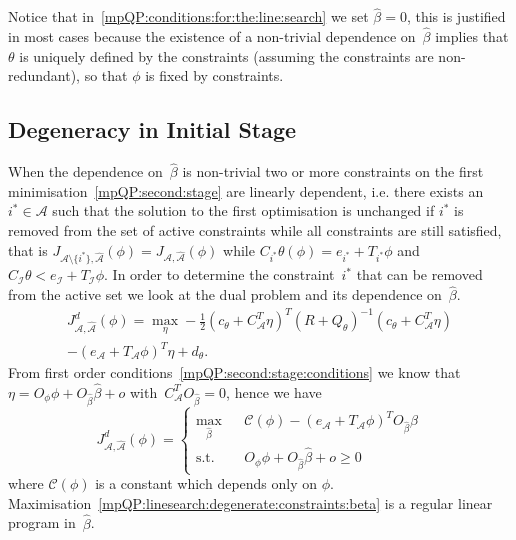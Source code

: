 \documentclass[journal]{IEEEtran}
\theoremstyle{remark}
\theoremstyle{definition}
\begin{document}
Notice that in~\eqref{mpQP:conditions:for:the:line:search} we set $\hat \beta=0$, this is justified in
most cases because the existence of a non-trivial dependence on~$\hat\beta$ implies that $\theta$ is uniquely
defined by the constraints (assuming the constraints are non-redundant), so that $\phi$ is fixed by constraints.
%
\subsection{Degeneracy in Initial Stage}\label{ssec:degeneracy}
%
When the dependence on~$\hat\beta$ is non-trivial two or more constraints on the first minimisation~\eqref{mpQP:second:stage}
are linearly dependent,
% 
i.e. there exists an $i^\ast\in\mathcal A$ such that the solution
to the first optimisation is unchanged if $i^\ast$ is removed from the set of active constraints while all
constraints are still satisfied, that is $J_{\mathcal A\setminus \{i^\ast\},\hat{\mathcal A}}(\phi)=J_{\mathcal A,\hat{\mathcal A}}(\phi)$
while $C_{i^\ast}\theta(\phi)=e_{i^\ast}+T_{i^\ast}\phi$ and $C_{\mathcal I}\theta<e_{\mathcal I}+T_{\mathcal I}\phi$.
%
In order to determine the constraint~$i^\ast$ that can be removed from the active set we look at the dual
problem and its dependence on~$\hat\beta$.
%
\begin{multline}
  J_{\mathcal A,\hat{\mathcal A}}^d(\phi) = \max_\eta -\frac{1}{2} (c_\theta+C^T_{\mathcal A}\eta)^T(R+Q_\theta)^{-1}
  (c_\theta+C^T_{\mathcal A}\eta)\\
  -(e_{\mathcal A}+T_{\mathcal A}\phi)^T \eta+ d_\theta.
\end{multline}
%
From first order conditions~\eqref{mpQP:second:stage:conditions} we know that 
$\eta = O_\phi\phi+O_{\hat\beta}\hat\beta+o$ with~$C^T_{\mathcal A}O_{\hat\beta}=0$, hence we have
%
\begin{equation}\label{mpQP:linesearch:degenerate:constraints:beta}
  J_{\mathcal A,\hat{\mathcal A}}^d(\phi) = \left\{\begin{array}{rcl}
  \max_{\hat\beta}& &\mathcal C(\phi) -(e_{\mathcal A}+T_{\mathcal A} \phi)^TO_{\hat\beta}\hat\beta\\
  \text{s.t.}& &O_\phi\phi+O_{\hat\beta}\hat\beta+o\geq0
  \end{array}\right.
\end{equation}
where $\mathcal C(\phi)$ is a constant which depends only on $\phi$. 
%
Maximisation~\eqref{mpQP:linesearch:degenerate:constraints:beta} is a regular linear program in~$\hat\beta$.
\end{document}
